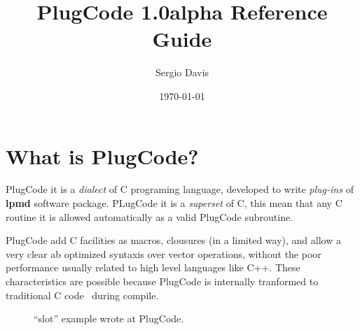 \documentclass[a4paper,12pt]{article}
\begin{document}
\lstset{basicstyle=\small\ttfamily}
\lstset{showstringspaces=false}
\lstset{captionpos=b}

\title{PlugCode 1.0alpha Reference Guide}
\author{Sergio Davis}
\date{\today}

\maketitle

\section{What is PlugCode?}

PlugCode it is a \textit{dialect} of C programing language, developed to write
\textit{plug-ins} of \textbf{lpmd} software package. PLugCode it is a
\emph{superset}  of C, this mean that any C routine it is allowed
automatically as a valid PlugCode subroutine.

PlugCode add C facilities as macros, clousures (in a limited way), and allow a
very clear ab optimized syntaxis over vector operations, without the poor
performance usually related to high level languages like C++. These
characteristics are possible because PlugCode is internally tranformed to
traditional C code\footnotemark ~ during compile.




\begin{figure}[ht]\centering{}
\caption{``slot'' example wrote at PlugCode.}
\label{fig_code_slot}
\end{figure}
\end{document}
